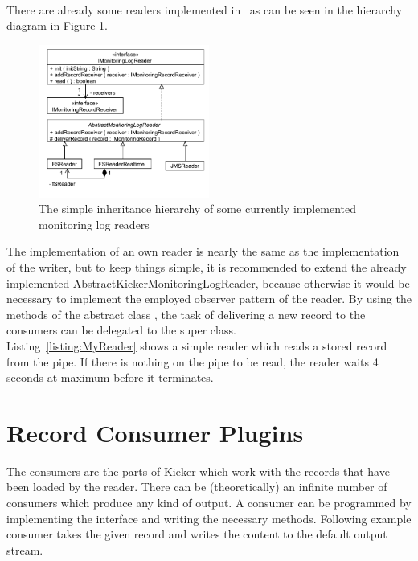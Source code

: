 \

		\noindent There are already some readers implemented in \Kieker\  as can be seen in the hierarchy diagram in Figure \ref{Figure:ReaderHierarchy}.

		\begin{figure}[H]
			\begin{centering}
				\includegraphics[width=0.5\textwidth]{images/kieker_readerimpls}
				\caption{The simple inheritance hierarchy of some currently implemented monitoring log readers}
				\label{Figure:ReaderHierarchy}
			\end{centering}
		\end{figure}

		\noindent The implementation of an own reader is nearly the same as the implementation of the writer, but to keep things simple, it is recommended to extend the already implemented AbstractKiekerMonitoringLogReader, because otherwise it would be necessary to implement the employed observer pattern of the reader. By using the methods of the abstract class , the task of delivering a new record to the consumers can be delegated to the super class.\\
		Listing~\ref{listing:MyReader} shows a simple reader which reads a stored record from the pipe. If there is nothing on the pipe to be read, the reader waits 4 seconds at maximum before it terminates.

		\setJavaCodeListing
		

	\section{Record Consumer Plugins}

		The consumers are the parts of Kieker which work with the records that have been loaded by the reader. There can be (theoretically) an infinite number of consumers which produce any kind of output. A consumer can be programmed by implementing the interface  and writing the necessary methods. Following example consumer takes the given record and writes the content to the default output stream.

